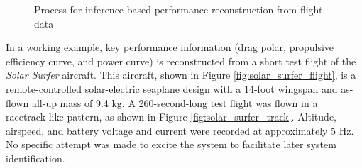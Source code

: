 \documentclass[12pt,vi,oneside,table]{report}
\begin{document}
    \begin{figure}[htbp!]
        \centering
        \caption{Process for inference-based performance reconstruction from flight data}
        \label{fig:overall_procedure}
    \end{figure}

    In a working example, key performance information (drag polar, propulsive efficiency curve, and power curve) is reconstructed from a short test flight of the \textit{Solar Surfer} aircraft. This aircraft, shown in Figure \ref{fig:solar_surfer_flight}, is a remote-controlled solar-electric seaplane design with a 14-foot wingspan and as-flown all-up mass of 9.4 kg. A 260-second-long test flight was flown in a racetrack-like pattern, as shown in Figure \ref{fig:solar_surfer_track}. Altitude, airspeed, and battery voltage and current were recorded at approximately 5 Hz. No specific attempt was made to excite the system to facilitate later system identification.
\end{document}
